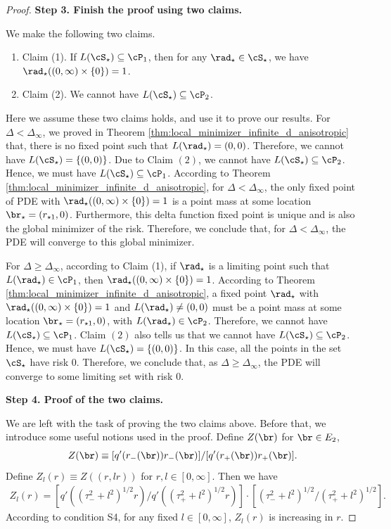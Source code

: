\documentclass[11pt]{article}
\begin{document}
\begin{proof}
\vskip 0.2cm
\noindent
{\bf Step 3. Finish the proof using two claims. }


We make the following two claims. 
\begin{enumerate}
\item[] Claim (1). If $L(\cS_\star) \subseteq \cP_1$, then for any $\rad_\star \in \cS_\star$, we have $\rad_\star((0, \infty) \times \{0\} ) = 1$. 
\item[] Claim (2). We cannot have $L(\cS_\star) \subseteq \cP_2$. 
\end{enumerate}

Here we assume these two claims holds, and use it to prove our results. For $\Delta < \Delta_\infty$, we proved in Theorem \ref{thm:local_minimizer_infinite_d_anisotropic} that, there is no fixed point such that $L(\rad_\star) = (0, 0)$. Therefore, we cannot have $L(\cS_\star) = \{ (0, 0) \}$. Due to Claim $(2)$, we cannot have $L(\cS_\star) \subseteq \cP_2$. Hence, we must have $L(\cS_\star) \subseteq \cP_1$. According to Theorem \ref{thm:local_minimizer_infinite_d_anisotropic}, for $\Delta < \Delta_\infty$, the only fixed point of PDE with $\rad_\star( (0, \infty) \times \{0\} ) = 1$ is a point mass at some location $\br_\star = (r_{\star1}, 0)$. Furthermore, this delta function fixed point is unique and is also the global minimizer of the risk. Therefore, we conclude that, for $\Delta < \Delta_\infty$, the PDE will converge to this global minimizer. 

For $\Delta \ge \Delta_\infty$, according to Claim (1), if $\rad_\star$ is a limiting point such that $L(\rad_\star) \in \cP_1$, then $\rad_\star( (0, \infty) \times \{0\} ) = 1$. According to Theorem \ref{thm:local_minimizer_infinite_d_anisotropic}, a fixed point $\rad_\star$ with $\rad_\star( (0, \infty) \times \{0\} ) = 1$ and $L(\rad_\star) \neq (0, 0)$ must be a point mass at some location $\br_\star = (r_{\star1}, 0)$, with $L(\rad_\star) \in \cP_2$. Therefore, we cannot have $L(\cS_\star) \subseteq \cP_1$. Claim $(2)$ also tells us that we cannot have $L(\cS_\star) \subseteq \cP_2$. Hence, we must have $L(\cS_\star) = \{ (0, 0) \}$. In this case, all the points in the set $\cS_\star$ have risk $0$. Therefore, we conclude that, as $\Delta \ge \Delta_\infty$, the PDE will converge to some limiting set with risk $0$. 


\vskip 0.2cm
\noindent
{\bf Step 4. Proof of the two claims. }


We are left with the task of proving the two claims above. Before that, we introduce some useful notions used in the proof. Define $Z(\br)$ for $\br \in E_2$, 
\begin{equation}
Z(\br) \equiv [q'(r_-(\br)) r_-(\br)] / [q'(r_+(\br)) r_+(\br)]. 
\end{equation}
Define $Z_l(r) \equiv Z((r, lr))$ for $r, l \in [0, \infty]$. Then we have
\begin{align}\label{eqn:Z_in_anisotropic_proof}
Z_l(r) = [q'((\tau_{-}^2 + l^2 )^{1/2} r) / q'((\tau_{+}^2 + l^2 )^{1/2} r)] \cdot [(\tau_{-}^2 + l^2 )^{1/2} / (\tau_{+}^2 + l^2 )^{1/2}].
\end{align}
According to condition {\sf S4}, for any fixed $l \in [0, \infty]$, $Z_l(r)$ is increasing in $r$.  


\end{proof}
\end{document}
